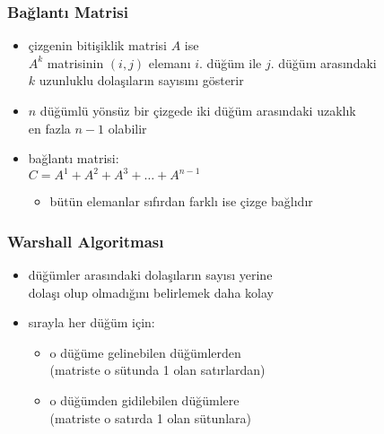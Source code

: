 \documentclass[dvipsnames]{beamer}
\theoremstyle{definition}
\theoremstyle{example}
\theoremstyle{plain}
\begin{document}
\begin{frame}
  \frametitle{Bağlantı Matrisi}

  \begin{itemize}
    \item çizgenin bitişiklik matrisi $A$ ise\\
      $A^k$ matrisinin $(i,j)$ elemanı $i$. düğüm ile $j$. düğüm arasındaki\\
      $k$ uzunluklu dolaşıların sayısını gösterir

    \pause
    \item $n$ düğümlü yönsüz bir çizgede iki düğüm arasındaki uzaklık\\
      en fazla $n-1$ olabilir

    \pause
    \medskip
    \item \alert{bağlantı matrisi}:\\
      $C = A^1 + A^2 + A^3 + \dots + A^{n-1}$
    \begin{itemize}
      \item bütün elemanlar sıfırdan farklı ise çizge bağlıdır
    \end{itemize}
  \end{itemize}
\end{frame}

\begin{frame}
  \frametitle{Warshall Algoritması}

  \begin{itemize}
    \item düğümler arasındaki dolaşıların sayısı yerine\\
      dolaşı olup olmadığını belirlemek daha kolay

    \pause
    \medskip
    \item sırayla her düğüm için:
    \begin{itemize}
      \item o düğüme gelinebilen düğümlerden\\
        (matriste o sütunda 1 olan satırlardan)

      \item o düğümden gidilebilen düğümlere\\
        (matriste o satırda 1 olan sütunlara)
    \end{itemize}
  \end{itemize}
\end{frame}
\end{document}
